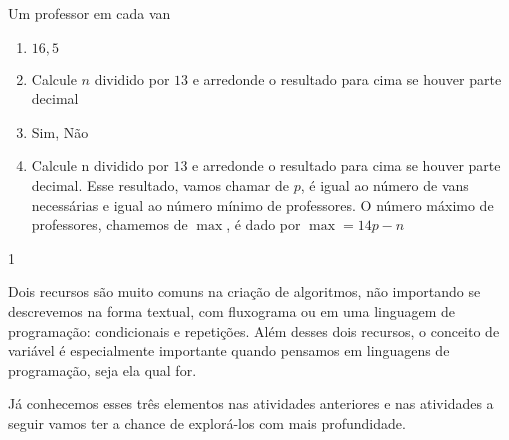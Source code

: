 \begin{answer}{Um professor em cada van}
{
\begin{enumerate}
\item $16{,}5$

\item Calcule $n$ dividido por $13$ e arredonde o resultado para cima se houver parte decimal

\item Sim, Não

\item Calcule n dividido por $13$ e arredonde o resultado para cima se houver parte decimal. Esse resultado, vamos chamar de $p$, é igual ao número de vans necessárias e igual ao número mínimo de professores. O número máximo de professores, chamemos de $\max$, é dado por $\max=14p-n$
\end{enumerate}
}{1}
\end{answer}

Dois recursos são muito comuns na criação de algoritmos, não importando se descrevemos na forma textual, com fluxograma ou em uma linguagem de programação: condicionais e repetições. Além desses dois recursos, o conceito de variável é especialmente importante quando pensamos em linguagens de programação, seja ela qual for.

Já conhecemos esses três elementos nas atividades anteriores e nas atividades a seguir vamos ter a chance de explorá-los com mais profundidade.

